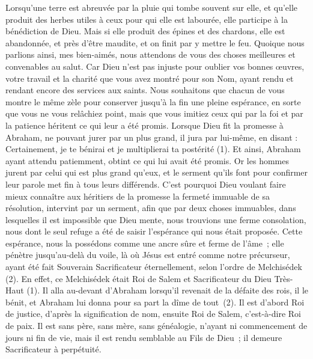 \begin{multicols}{2}
Lorsqu’une terre est abreuvée par la pluie qui tombe souvent sur elle, et qu’elle produit des herbes utiles à ceux pour qui elle est labourée, elle participe à la bénédiction de Dieu.
Mais si elle produit des épines et des chardons, elle est abandonnée, et près d’être maudite, et on finit par y mettre le feu.
Quoique nous parlions ainsi, mes bien-aimés, nous attendons de vous des choses meilleures et convenables au salut.
Car Dieu n'est pas injuste pour oublier vos bonnes œuvres, votre travail et la charité que vous avez montré pour son Nom, ayant rendu et rendant encore des services aux saints.
Nous souhaitons que chacun de vous montre le même zèle pour conserver jusqu'à la fin une pleine espérance,
en sorte que vous ne vous relâchiez point, mais que vous imitiez ceux qui par la foi et par la patience héritent ce qui leur a été promis.
Lorsque Dieu fit la promesse à Abraham, ne pouvant jurer par un plus grand, il jura par lui-même,
en disant : Certainement, je te bénirai et je multiplierai ta postérité (1).
Et ainsi, Abraham ayant attendu patiemment, obtint ce qui lui avait été promis.
Or les hommes jurent par celui qui est plus grand qu'eux, et le serment qu'ils font pour confirmer leur parole met fin à tous leurs différends.
C'est pourquoi Dieu voulant faire mieux connaître aux héritiers de la promesse la fermeté immuable de sa résolution, intervint par un serment,
afin que par deux choses immuables, dans lesquelles il est impossible que Dieu mente, nous trouvions une ferme consolation, nous dont le seul refuge a été de saisir l'espérance qui nous était proposée.
Cette espérance, nous la possédons comme une ancre sûre et ferme de l'âme ; elle pénètre jusqu'au-delà du voile,
là où Jésus est entré comme notre précurseur, ayant été fait Souverain Sacrificateur éternellement, selon l'ordre de Melchisédek (2).
\VerseOne{}En effet, ce Melchisédek était Roi de Salem et Sacrificateur du Dieu Très-Haut (1). Il alla au-devant d'Abraham lorsqu'il revenait de la défaite des rois, il le bénit,
et Abraham lui donna pour sa part la dîme de tout (2). Il est d’abord Roi de justice, d’après la signification de nom, ensuite Roi de Salem, c’est-à-dire Roi de paix.
Il est sans père, sans mère, sans généalogie, n'ayant ni commencement de jours ni fin de vie, mais il est rendu semblable au Fils de Dieu ; il demeure Sacrificateur à perpétuité.

\end{multicols}
